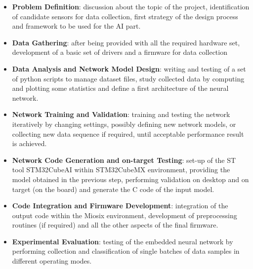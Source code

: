 \begin{itemize}
	\item \textbf{Problem Definition}: discussion about the topic of the project, identification of candidate sensors for data collection, first strategy of the design process and framework to be used for the AI part.
	\item \textbf{Data Gathering}: after being provided with all the required hardware set, development of a basic set of drivers and a firmware for data collection
	\item \textbf{Data Analysis and Network Model Design}: writing and testing of a set of python scripts to manage dataset files, study collected data by computing and plotting some statistics and define a first architecture of the neural network.
	\item \textbf{Network Training and Validation}: training and testing the network iteratively by changing settings, possibly defining new network models, or collecting new data sequence if required, until acceptable performance result is achieved.
	\item \textbf{Network Code Generation and on-target Testing}: set-up of the ST tool STM32CubeAI within STM32CubeMX environment, providing the model obtained in the previous step, performing validation on desktop and on target (on the board) and generate the C code of the input model.
	\item \textbf{Code Integration and Firmware Development}: integration of the output code within the Miosix environment, development of preprocessing routines (if required) and all the other aspects of the final firmware.
	\item \textbf{Experimental Evaluation}: testing of the embedded neural network by performing  collection and classification of single batches of data samples in different operating modes. 
\end{itemize}
\newpage

